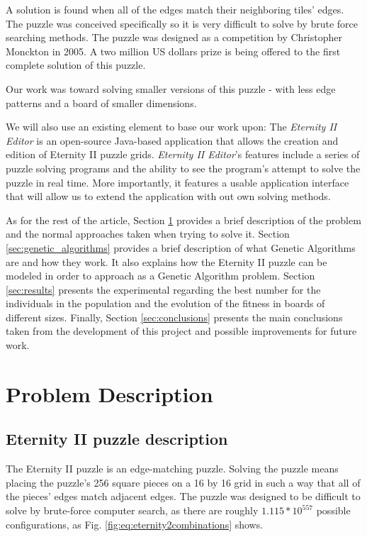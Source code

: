 \documentclass{llncs}
\begin{document}
A solution is found when all of the edges match their neighboring tiles' edges. The puzzle was conceived specifically so it is very difficult to solve by brute force searching methods. The puzzle was designed as a competition by Christopher Monckton in 2005.\cite{monckton} A two million US dollars prize is being offered to the first complete solution of this puzzle.\cite{unsolved}

Our work was toward solving smaller versions of this puzzle - with less edge patterns and a board of smaller dimensions.

We will also use an existing element to base our work upon: The \textit{Eternity II Editor} is an open-source Java-based application that allows the creation and edition of Eternity II puzzle grids. \textit{Eternity II Editor}'s features include a series of puzzle solving programs and the ability to see the program's attempt to solve the puzzle in real time. More importantly, it features a usable application interface that will allow us to extend the application with out own solving methods.

As for the rest of the article, Section \ref{sec:problem_description} provides a brief description of the problem and the normal approaches taken when trying to solve it. Section \ref{sec:genetic_algorithms} provides a brief description of what Genetic Algorithms are and how they work. It also explains how the Eternity II puzzle can be modeled in order to approach as a Genetic Algorithm problem. Section \ref{sec:results} presents the experimental regarding the best number for the individuals in the population and the evolution of the fitness in boards of different sizes. Finally, Section \ref{sec:conclusions} presents the main conclusions taken from the development of this project and possible improvements for future work.

\section{Problem Description}\label{sec:problem_description}

\subsection{Eternity II puzzle description}\label{sec:puzzle_description}

The Eternity II puzzle is an edge-matching puzzle. Solving the puzzle means placing the puzzle's 256 square pieces on a 16 by 16 grid in such a way that all of the pieces' edges match adjacent edges. The puzzle was designed to be difficult to solve by brute-force computer search, as there are roughly $1.115 * 10 ^ {557}$ possible configurations, as Fig. \ref{fig:eq:eternity2combinations} shows.
\end{document}
